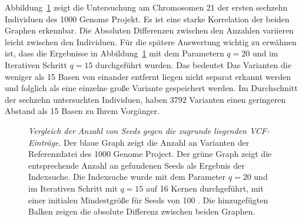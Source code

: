 \documentclass[12pt]{article}
\begin{document}
Abbildung~\ref{fig:seeds} zeigt die Untersuchung am Chromosomen 21 der ersten sechzehn Individuen des 1000 Genome Projekt. Es ist eine starke Korrelation der beiden Graphen erkennbar. Die Absoluten Differenzen zwischen den Anzahlen variieren leicht zwischen den Individuen. Für die spätere Auswertung wichtig zu erwähnen ist, dass die Ergebnisse in Abbildung~\ref{fig:seeds} mit dem Parametern $q=20$ und im Iterativen Schritt $q=15$ durchgeführt wurden. Das bedeutet Das Varianten die weniger als 15 Basen von einander entfernt liegen nicht separat erkannt werden und folglich als eine einzelne große Variante gespeichert werden. Im Durchschnitt der sechzehn untersuchten Individuen, haben $3792$ Varianten einen geringeren Abstand als 15 Basen zu Ihrem Vorgänger. 

\begin{figure}[t]
\caption{\label{fig:seeds}\emph{Vergleich der Anzahl von Seeds gegen die zugrunde liegenden VCF-Einträge}. Der blaue Graph zeigt die Anzahl an Varianten der Referenzdatei des 1000 Genome Project. Der grüne Graph zeigt die entsprechende Anzahl an gefundenen Seeds als Ergebnis der Indexsuche. Die Indexsuche wurde mit dem Parameter $q=20$ und im Iterativen Schritt mit $q=15$ auf 16 Kernen durchgeführt, mit einer initialen Mindestgröße für Seeds von 100 . Die hinzugefügten Balken zeigen die absolute Differenz zwischen beiden Graphen. }
\end{figure}
\end{document}
